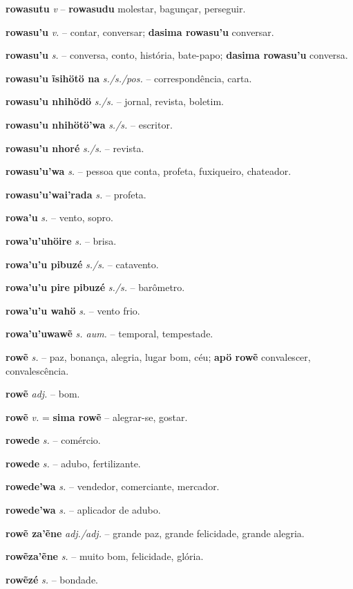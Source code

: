 \textbf{rowasutu} \textit{v} -- \textbf{rowasudu} molestar, bagunçar, perseguir.

\textbf{rowasu'u} \textit{v.} -- contar, conversar; \textbf{dasima rowasu'u} conversar.

\textbf{rowasu'u} \textit{s.} -- conversa, conto, história, bate-papo; \textbf{dasima rowasu'u} conversa.

\textbf{rowasu'u ĩsihötö na} \textit{s./s./pos.} -- correspondência, carta.

\textbf{rowasu'u nhihödö} \textit{s./s.} -- jornal, revista, boletim.

\textbf{rowasu'u nhihötö'wa} \textit{s./s.} -- escritor.

\textbf{rowasu'u nhoré} \textit{s./s.} -- revista.

\textbf{rowasu'u'wa} \textit{s.} -- pessoa que conta, profeta, fuxiqueiro, chateador.

\textbf{rowasu'u'wai'rada} \textit{s.} -- profeta.

\textbf{rowa'u} \textit{s.} -- vento, sopro.

\textbf{rowa'u'uhöire} \textit{s.} -- brisa.

\textbf{rowa'u'u pibuzé} \textit{s./s.} -- catavento.

\textbf{rowa'u'u pire pibuzé} \textit{s./s.} -- barômetro.

\textbf{rowa'u'u wahö} \textit{s.} -- vento frio.

\textbf{rowa'u'uwawẽ} \textit{s. aum.} -- temporal, tempestade.

\textbf{rowẽ} \textit{s.} -- paz, bonança, alegria, lugar bom, céu; \textbf{apö rowẽ} convalescer, convalescência.

\textbf{rowẽ} \textit{adj.} -- bom.

\textbf{rowẽ} \textit{v.} = \textbf{sima rowẽ} -- alegrar-se, gostar.

\textbf{rowede} \textit{s.} -- comércio.

\textbf{rowede} \textit{s.} -- adubo, fertilizante.

\textbf{rowede'wa} \textit{s.} -- vendedor, comerciante, mercador.

\textbf{rowede'wa} \textit{s.} -- aplicador de adubo.

\textbf{rowẽ za'ẽne} \textit{adj./adj.} -- grande paz, grande felicidade, grande alegria.

\textbf{rowẽza'ẽne} \textit{s.} -- muito bom, felicidade, glória.

\textbf{rowẽzé} \textit{s.} -- bondade.

